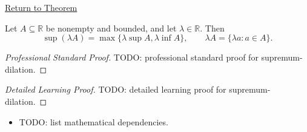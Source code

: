 \newpage
{}
\label{prf:supremum-dilation}

\begin{remark*}[Return]
\hyperref[thm:supremum-dilation]{Return to Theorem}
\end{remark*}

\begin{theorem*}
Let $A\subseteq\mathbb{R}$ be nonempty and bounded, and let $\lambda\in\mathbb{R}$. Then
\[
  \sup(\lambda A)=\max\{\lambda\sup A,\lambda\inf A\},
  \qquad
  \lambda A=\{\lambda a:a\in A\}.
\]
\end{theorem*}

\begin{proof}[Professional Standard Proof]
\LRAProofBodyStart
TODO: professional standard proof for supremum-dilation.
\end{proof}

\begin{proof}[Detailed Learning Proof]
\LRAProofBodyStart
TODO: detailed learning proof for supremum-dilation.
\end{proof}

\begin{remark*}
\end{remark*}

\begin{dependencies}
\begin{itemize}
  \item TODO: list mathematical dependencies.
\end{itemize}
\end{dependencies}

\clearpage
